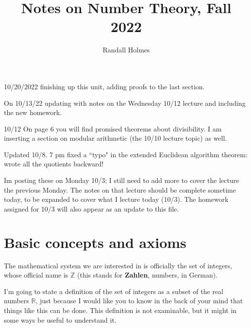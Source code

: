 \documentclass[12pt]{article}
\title{Notes on Number Theory, Fall 2022}
\author{Randall Holmes}
\begin{document}
\maketitle

10/20/2022 finishing up this unit, adding proofs to the last section.

On 10/13/22 updating with notes on the Wednesday 10/12 lecture and including the new homework.

10/12  On page 6 you will find promised theorems about divisibility.  I am inserting a section on modular arithmetic (the 10/10 lecture topic) as well.

Updated 10/8.  7 pm fixed a ``typo" in the extended Euclidean algorithm theorem:  wrote all the quotients backward!

Im posting these on Monday 10/3;  I still need to add more to cover the lecture the previous Monday.  The notes
on that lecture should be complete sometime today, to be expanded to cover what I lecture today (10/3).  The homework assigned for 10/3 will also appear as an update to this file.



\tableofcontents

\section{Basic concepts and axioms}

The mathematical system we are interested in is officially the set of integers, whose official name is $\mathbb Z$ (this stands for {\bf Zahlen}, numbers, in German).

I'm going to state a definition of the set of integers as a subset of the real numbers $\mathbb R$, just because I would like you to know in the back of your mind that things like this can be done.  This definition is not examinable, but it might in some ways be useful to understand it.
\end{document}
